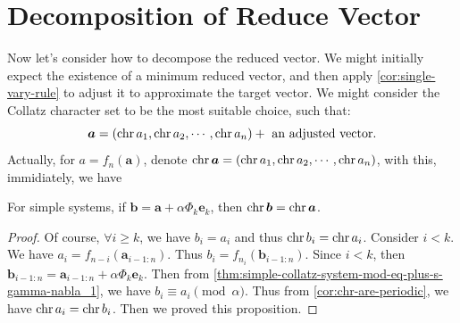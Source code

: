 \section{Decomposition of Reduce Vector}\label{sec:decomposition-of-reduce-vector}

Now let's consider how to decompose the reduced vector. We might initially expect the existence of a minimum reduced vector, and then apply \cref{cor:single-vary-rule} to adjust it to approximate the target vector. We might consider the Collatz character set to be the most suitable choice, such that:
\[ \bm{a} = (\operatorname{chr} a_1, \operatorname{chr} a_2, \cdots, \operatorname{chr} a_n) + \text{ an adjusted vector}. \]
Actually, for $a = f_{n}(\bm{a})$, denote $\operatorname{chr} \bm{a} = (\operatorname{chr} a_1, \operatorname{chr} a_2, \cdots, \operatorname{chr} a_n)$,
with this, immidiately, we have
\begin{theorem}\label{thm:chr-not-change-with-adjust-of-alpha-Phi-k}
    For simple systems, if $\bm{b} = \bm{a} + \alpha\Phi_k\bm{e}_k$, then $\operatorname{chr} \bm{b} = \operatorname{chr} \bm{a}$.
\end{theorem}
\begin{proof}
    Of course, $\forall i \ge k$, we have $b_i = a_i$ and thus $\operatorname{chr} b_i = \operatorname{chr} a_i$. \newline
    Consider $i < k$. We have $a_i = f_{n-i}(\bm{a}_{i-1:n})$. Thus $b_i = f_{n_i}(\bm{b}_{i-1:n})$. Since $i < k$, then $\bm{b}_{i-1:n} = \bm{a}_{i-1:n} + \alpha\Phi_k\bm{e}_k$. Then from \cref{thm:simple-collatz-system-mod-eq-plus-s-gamma-nabla_1}, we have $b_i \equiv a_i \pmod{\alpha}$. Thus from \cref{cor:chr-are-periodic}, we have $\operatorname{chr} a_i = \operatorname{chr} b_i$. Then we proved this proposition.
\end{proof}

